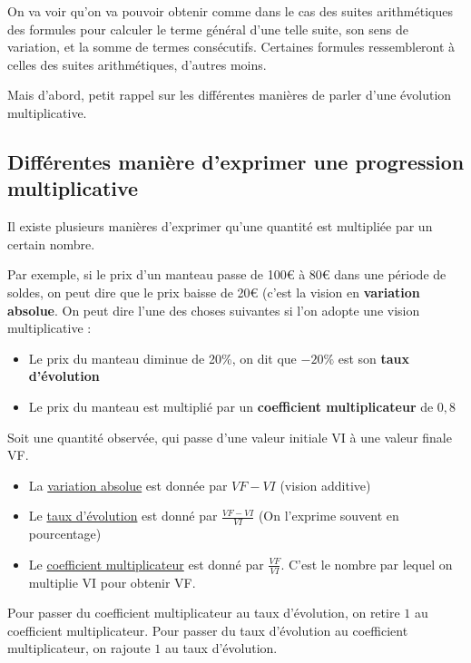 \documentclass[10pt,a4paper]{book}
\begin{document}
On va voir qu'on va pouvoir obtenir comme dans le cas des suites arithmétiques des formules pour calculer le terme général d'une telle suite, son sens de variation, et la somme de termes consécutifs. Certaines formules ressembleront à celles des suites arithmétiques, d'autres moins.

Mais d'abord, petit rappel sur les différentes manières de parler d'une évolution multiplicative.

\subsection{Différentes manière d'exprimer une progression multiplicative}

Il existe plusieurs manières d'exprimer qu'une quantité est multipliée par un certain nombre.

Par exemple, si le prix d'un manteau passe de 100€ à 80€ dans une période de soldes, on peut dire que le prix baisse de 20€ (c'est la vision en \textbf{variation absolue}. On peut dire l'une des  choses suivantes si l'on adopte une vision multiplicative :

\begin{itemize}
    \item Le prix du manteau diminue de 20\%, on dit que $-20\%$ est son \textbf{taux d'évolution}
    \item Le prix du manteau est multiplié par un \textbf{coefficient multiplicateur} de $0{,}8$
\end{itemize}

\begin{de}
    Soit une quantité observée, qui passe d'une valeur initiale VI à une valeur finale VF.
    \begin{itemize}
        \item La \underline{variation absolue} est donnée par $VF - VI$ (vision additive)
        \item Le \underline{taux d'évolution} est donné par $\frac{VF-VI}{VI}$ (On l'exprime souvent en pourcentage)
        \item Le \underline{coefficient multiplicateur} est donné par 
        $\frac{VF}{VI}$. C'est le nombre par lequel on multiplie VI pour obtenir VF.
    \end{itemize}
\end{de}

\begin{prop}
    Pour passer du coefficient multiplicateur au taux d'évolution, on retire $1$ au coefficient multiplicateur. \newline
    Pour passer du taux d'évolution au coefficient multiplicateur, on rajoute $1$ au taux d'évolution.
\end{prop}
\end{document}

